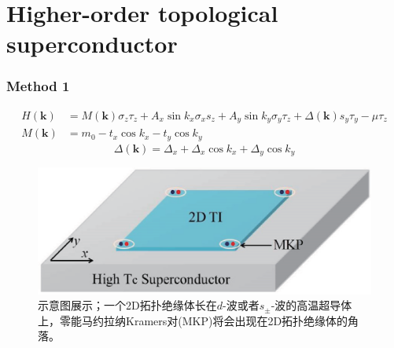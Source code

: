 \documentclass[10pt,aspectratio=169]{beamer} %
\begin{document}
\section{Higher-order topological superconductor}
\begin{frame}
\frametitle{Method 1}
\begin{equation}
\begin{aligned}
H(\mathbf{k})&=M(\mathbf{k})\sigma_z\tau_z+A_x\sin k_x\sigma_xs_z+A_y\sin k_y\sigma_y\tau_z+\Delta(\mathbf{k})s_y\tau_y-\mu\tau_z\\
M(\mathbf{k})&=m_0-t_x\cos k_x-t_y\cos k_y\label{hoti2}
\end{aligned}
\end{equation}
\begin{equation}
\Delta(\mathbf{k})=\Delta_x+\Delta_x\cos k_x+\Delta_y\cos k_y
\end{equation}
\begin{figure}[h]
\centering
\includegraphics[scale=0.4]{pic/fig8}
\caption{示意图展示；一个2D拓扑绝缘体长在$d$-波或者$s_\pm$-波的高温超导体上，零能马约拉纳Kramers对(MKP)将会出现在2D拓扑绝缘体的角落。}\label{fig8}
\end{figure}
\end{frame}
\end{document}
